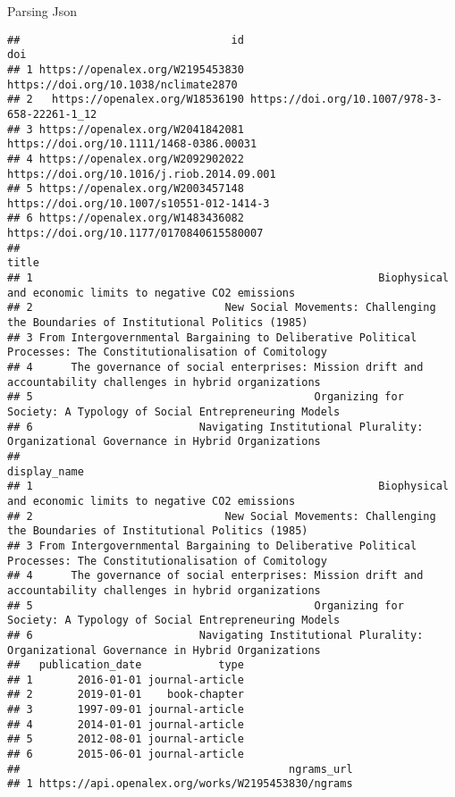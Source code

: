 \documentclass[
  10pt,
  ignorenonframetext,
  aspectratio=169]{beamer}
\begin{document}
\begin{frame}[fragile]{Parsing Json}
\begin{verbatim}
##                                 id                                          doi
## 1 https://openalex.org/W2195453830         https://doi.org/10.1038/nclimate2870
## 2   https://openalex.org/W18536190 https://doi.org/10.1007/978-3-658-22261-1_12
## 3 https://openalex.org/W2041842081      https://doi.org/10.1111/1468-0386.00031
## 4 https://openalex.org/W2092902022   https://doi.org/10.1016/j.riob.2014.09.001
## 5 https://openalex.org/W2003457148    https://doi.org/10.1007/s10551-012-1414-3
## 6 https://openalex.org/W1483436082     https://doi.org/10.1177/0170840615580007
##                                                                                                            title
## 1                                                      Biophysical and economic limits to negative CO2 emissions
## 2                              New Social Movements: Challenging the Boundaries of Institutional Politics (1985)
## 3 From Intergovernmental Bargaining to Deliberative Political Processes: The Constitutionalisation of Comitology
## 4      The governance of social enterprises: Mission drift and accountability challenges in hybrid organizations
## 5                                            Organizing for Society: A Typology of Social Entrepreneuring Models
## 6                          Navigating Institutional Plurality: Organizational Governance in Hybrid Organizations
##                                                                                                     display_name
## 1                                                      Biophysical and economic limits to negative CO2 emissions
## 2                              New Social Movements: Challenging the Boundaries of Institutional Politics (1985)
## 3 From Intergovernmental Bargaining to Deliberative Political Processes: The Constitutionalisation of Comitology
## 4      The governance of social enterprises: Mission drift and accountability challenges in hybrid organizations
## 5                                            Organizing for Society: A Typology of Social Entrepreneuring Models
## 6                          Navigating Institutional Plurality: Organizational Governance in Hybrid Organizations
##   publication_date            type
## 1       2016-01-01 journal-article
## 2       2019-01-01    book-chapter
## 3       1997-09-01 journal-article
## 4       2014-01-01 journal-article
## 5       2012-08-01 journal-article
## 6       2015-06-01 journal-article
##                                          ngrams_url
## 1 https://api.openalex.org/works/W2195453830/ngrams

\end{verbatim}
\end{frame}
\end{document}

